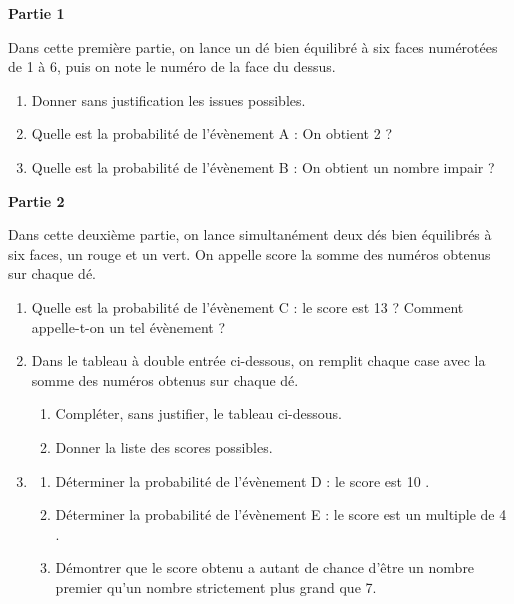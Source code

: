 
	\textbf{Partie 1}
	
	Dans cette première partie, on lance un dé bien équilibré à six faces numérotées de 1 à 6, puis on note le numéro de la face du dessus.
	
	\begin{enumerate}
		\item Donner sans justification les issues possibles.
		
		\item Quelle est la probabilité de l'évènement A : \og  On obtient 2  \fg{} ?
		
		\item Quelle est la probabilité de l'évènement B : \og  On obtient un nombre impair  \fg{} ?
	\end{enumerate}

	\textbf{Partie 2}
	
	Dans cette deuxième partie, on lance simultanément deux dés bien équilibrés à six faces, un rouge et un vert. On appelle \og  score  \fg{} la somme des numéros obtenus sur chaque dé.
	
	\begin{enumerate}
		\item Quelle est la probabilité de l'évènement C : \og  le score est 13  \fg{} ? Comment appelle-t-on un tel évènement ?
		
		\item Dans le tableau à double entrée ci-dessous, on remplit chaque case avec la somme des numéros obtenus sur chaque dé.
		
		\begin{enumerate}
			\item Compléter, sans justifier, le tableau ci-dessous.
			
			\item Donner la liste des scores possibles.
		\end{enumerate}
	
		\item \begin{enumerate}
			\item Déterminer la probabilité de l'évènement D : \og  le score est 10  \fg{}.
			
			\item Déterminer la probabilité de l'évènement E : \og  le score est un multiple de 4  \fg{}.
			
			\item Démontrer que le score obtenu a autant de chance d'être un nombre premier qu'un nombre strictement plus grand que 7.
		\end{enumerate}
	\end{enumerate}

